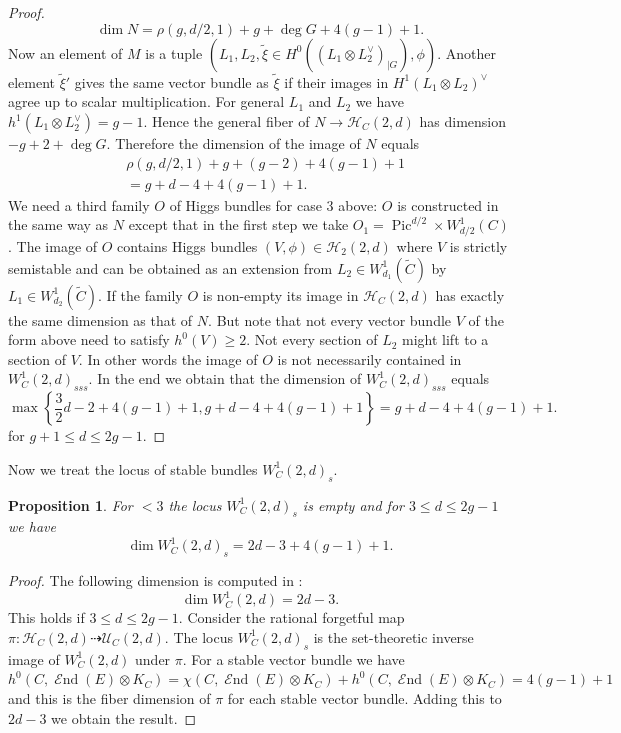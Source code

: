 \documentclass[12pt]{extarticle}
\newtheorem{proposition}[theorem]{Proposition}
\theoremstyle{definition}
\numberwithin{theorem}{section}
\newcommand{\cH}{\mathcal{H}}
\newcommand{\op}{\operatorname}
\DeclareMathOperator{\End}{\mathcal{E}nd}
\renewcommand{\tilde}{\widetilde}		%
\begin{document}
\begin{proof}
\begin{equation*}
\dim N = \rho(g,d/2,1) + g +\deg G + 4(g-1) +1.
\end{equation*} 
Now an element of $M$ is a tuple $(L_1,L_2,\tilde{\xi} \in H^0(\left(L_1\otimes L_2^\vee\right)_{|G}),\phi)$. 
Another element $\tilde{\xi}'$ gives the same vector bundle as $\tilde{\xi}$ if their images in $H^1(L_1\otimes L_2)^\vee$ agree up to scalar multiplication. For general $L_1$ and $L_2$ we have $h^1(L_1\otimes L_2^\vee) = g-1$. Hence the general fiber of $N \to \cH_C(2,d)$ has dimension $ - g +2+\deg G$. Therefore the dimension of the image of $N$ equals 
\begin{align*}
&\rho(g,d/2,1)+g +(g-2) +4(g-1)+1 \\
&= g + d -4 +4(g-1)+1.
\end{align*} 
We need a third family $O$ of Higgs bundles for case 3 above: $O$ is constructed in the same way as $N$ except that in the first step we take $O_1 = \op{Pic}^{d/2} \times W^1_{d/2}(C)$. The image of $O$ contains Higgs bundles $(V,\phi)\in \cH_2(2,d)$ where $V$ is strictly semistable and can be obtained as an extension from $L_2 \in W^1_{d_1}(\tilde{C})$ by $L_1 \in W^1_{d_2}(\tilde{C})$. If the family $O$ is non-empty its image in $\cH_C(2,d)$ has exactly the same dimension as that of $N$. But note that not every vector bundle $V$ of the form above need to satisfy $h^0(V)\geq 2$. Not every section of $L_2$ might lift to a section of $V$. In other words the image of $O$ is not necessarily contained in $W_C^1(2,d)_{sss}$. In the end we obtain that the dimension of $W_C^1(2,d)_{sss}$ equals
\begin{equation*}
\op{max}\left\{\frac{3}{2}d-2+4(g-1)+1,g + d -4+4(g-1)+1\right\} = g+d-4+4(g-1)+1.
\end{equation*}  
for $g+1\leq d \leq 2g-1$. 
\end{proof}
Now we treat the locus of stable bundles $W_C^1(2,d)_s$.
\begin{proposition}
For $< 3$ the locus $W^1_C(2,d)_s$ is empty and for $3\leq d \leq 2g-1$ we have 
\begin{equation}
\dim W_C^1(2,d)_{s}  = 2d -3 + 4(g-1) +1.
\end{equation}
\end{proposition}
\begin{proof}
The following dimension is computed in \cite{Teixidor}: 
\begin{equation*}
\dim W^1_C(2,d) = 2d -3. 
\end{equation*}
This holds if $3 \leq d \leq 2g-1$. Consider the rational forgetful map $\pi: \cH_C(2,d) \dashrightarrow \mathcal{U}_C(2,d)$. The locus $W_C^1(2,d)_{s}$ is the set-theoretic inverse image of $W^1_C(2,d)$ under $\pi$. For a stable vector bundle we have $h^0(C,\End(E) \otimes K_C) = \chi(C,\End(E) \otimes K_C) + h^0(C,\End(E) \otimes K_C) = 4(g-1) +1$ and this is the fiber dimension of $\pi$ for each stable vector bundle. Adding this to $2d-3$  we obtain the result. 
\end{proof}
\end{document}
